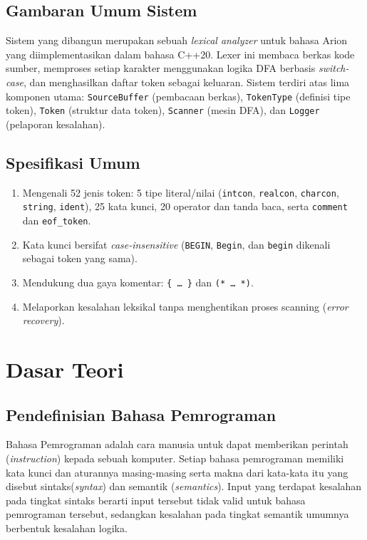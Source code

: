 \documentclass[12pt,a4paper]{article}
\begin{document}
\subsection{Gambaran Umum Sistem}
Sistem yang dibangun merupakan sebuah \textit{lexical analyzer} untuk bahasa Arion yang diimplementasikan dalam bahasa C++20. Lexer ini membaca berkas kode sumber, memproses setiap karakter menggunakan logika DFA berbasis \textit{switch-case}, dan menghasilkan daftar token sebagai keluaran. Sistem terdiri atas lima komponen utama: \texttt{SourceBuffer} (pembacaan berkas), \texttt{TokenType} (definisi tipe token), \texttt{Token} (struktur data token), \texttt{Scanner} (mesin DFA), dan \texttt{Logger} (pelaporan kesalahan).

\subsection{Spesifikasi Umum}
\begin{enumerate}[label=\arabic*.]
  \item Mengenali 52 jenis token: 5 tipe literal/nilai (\texttt{intcon}, \texttt{realcon}, \texttt{charcon}, \texttt{string}, \texttt{ident}), 25 kata kunci, 20 operator dan tanda baca, serta \texttt{comment} dan \texttt{eof\_token}.
  \item Kata kunci bersifat \textit{case-insensitive} (\texttt{BEGIN}, \texttt{Begin}, dan \texttt{begin} dikenali sebagai token yang sama).
  \item Mendukung dua gaya komentar: \texttt{\{ \ldots\ \}} dan \texttt{(* \ldots\ *)}.
  \item Melaporkan kesalahan leksikal tanpa menghentikan proses scanning (\textit{error recovery}).
\end{enumerate}


\section{Dasar Teori}

\subsection{Pendefinisian Bahasa Pemrograman}
Bahasa Pemrograman adalah cara manusia untuk dapat memberikan perintah
(\textit{instruction}) kepada sebuah komputer. Setiap bahasa pemrograman
memiliki kata kunci dan aturannya masing-masing serta makna dari kata-kata itu
yang disebut sintaks(\textit{syntax}) dan semantik (\textit{semantics}).
Input yang terdapat kesalahan pada tingkat sintaks berarti input tersebut tidak
valid untuk bahasa pemrograman tersebut, sedangkan kesalahan pada tingkat
semantik umumnya berbentuk kesalahan logika.
\end{document}
